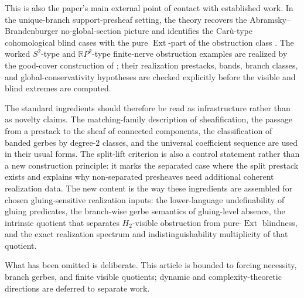 This is also the paper's main external point of contact with established work. In the unique-branch support-presheaf setting, the theory recovers the Abramsky--Brandenburger no-global-section picture and identifies the Car\`u-type cohomological blind cases with the pure $\operatorname{Ext}$-part of the obstruction class \cite{AbramskyBrandenburger2011,AbramskyMansfieldBarbosa2012,AbramskyBarbosaKishidaLalMansfield2015,Caru2017}. The worked $S^2$-type and $\mathbb{R}P^2$-type finite-nerve obstruction examples are realized by the good-cover construction of ; their realization prestacks, bands, branch classes, and global-conservativity hypotheses are checked explicitly before the visible and blind extremes are computed.

The standard ingredients should therefore be read as infrastructure rather than
as novelty claims. The matching-family description of sheafification, the
passage from a prestack to the sheaf of connected components, the classification
of banded gerbes by degree-$2$ classes, and the universal coefficient sequence
are used in their usual forms. The split-lift criterion is also a control
statement rather than a new construction principle: it marks the separated case
where the split prestack exists and explains why non-separated presheaves need
additional coherent realization data. The new content is the way these
ingredients are assembled for chosen gluing-sensitive realization inputs: the
lower-language undefinability of gluing predicates, the branch-wise gerbe
semantics of gluing-level absence, the intrinsic quotient that separates
$H_2$-visible obstruction from pure-$\operatorname{Ext}$ blindness, and the
exact realization spectrum and indistinguishability multiplicity of that
quotient.

What has been omitted is deliberate. This article is bounded to forcing necessity, branch gerbes, and finite visible quotients; dynamic and complexity-theoretic directions are deferred to separate work.
